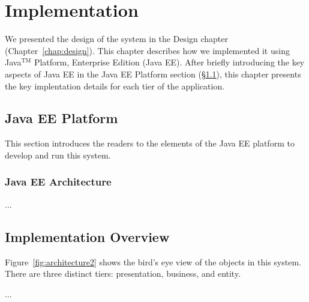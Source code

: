 
\chapter{Implementation}
\label{chap:implementation}


We presented the design of the system in the Design chapter
(Chapter~\ref{chap:design}).  This chapter describes how we
implemented it using Java$^{\textrm{TM}}$ Platform, Enterprise Edition
(Java EE).  After briefly introducing the key aspects of Java EE in
the Java EE Platform section (\S\ref{sec:jee}), this chapter presents
the key implentation details for each tier of the application.

\section{Java EE Platform}
\label{sec:jee}

This section introduces the readers to the elements of the Java EE
platform to develop and run this system.

\subsection{Java EE Architecture}
\label{sec:jeeintro}


...




\section{Implementation Overview}
\label{sec:implementsteps}

Figure~\ref{fig:architecture2} shows the bird's eye view of the
objects in this system. There are three distinct tiers: presentation,
business, and entity.

...


